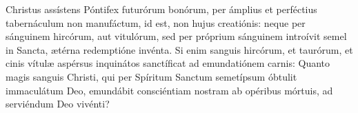 Christus assístens Póntifex futurórum bonórum,
	per ámplius et perféctius tabernáculum non manufáctum,
	id est, non hujus creatiónis:
	neque per sánguinem hircórum, aut vitulórum,
	sed per próprium sánguinem introívit semel in Sancta, ætérna redemptióne invénta.
Si enim sanguis hircórum, et taurórum,
	et cinis vítulæ aspérsus inquinátos sanctíficat ad emundatiónem carnis:
Quanto magis sanguis Christi,
	qui per Spíritum Sanctum semetípsum óbtulit immaculátum Deo,
	emundábit consciéntiam nostram ab opéribus mórtuis,
	ad serviéndum Deo vivénti?
